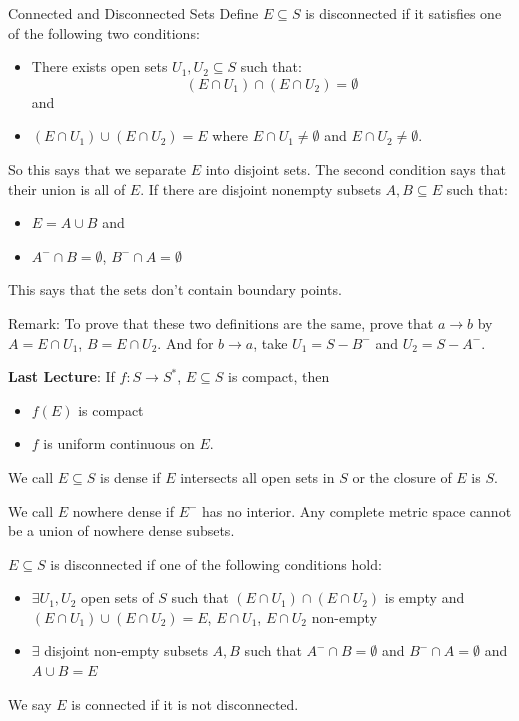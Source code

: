\documentclass{report}
\begin{document}
\begin{definition}{Connected and Disconnected Sets}
    Define $E \subseteq S$ is disconnected if it satisfies one of the following two conditions:
        \begin{itemize}
            \item There exists open sets $U_{1}, U_{2} \subseteq S$ such that:
                \begin{equation*}
                    (E \cap U_{1}) \cap (E \cap U_{2}) = \emptyset
                \end{equation*}
            and 

            \item  $(E \cap U_{1}) \cup (E \cap  U_{2}) = E$ where $E \cap U_{1} \neq \emptyset$ and $E \cap U_{2} \neq \emptyset$.
        \end{itemize}
    So this says that we separate $E$ into disjoint sets. The second condition says that their union is all of $E$. If there are disjoint nonempty subsets $A, B \subseteq E$ such that:
        \begin{itemize}
            \item $E = A \cup B$ and

            \item $A^{-} \cap B = \emptyset$, $B^{-} \cap A = \emptyset$
        \end{itemize}
    This says that the sets don't contain boundary points.
\end{definition}

Remark: To prove that these two definitions are the same, prove that $a \rightarrow b$ by $A = E \cap U_{1}$, $B = E \cap U_{2}$. And for $b \rightarrow a$, take $U_{1} = S - B^{-}$ and $U_{2} = S - A^{-}$.

\textbf{Last Lecture}: If $f: S \rightarrow S^{*}$, $E \subseteq S$ is compact, then 
    \begin{itemize}
        \item $f(E)$ is compact

        \item $f$ is uniform continuous on $E$. 
    \end{itemize}

We call $E \subseteq S$ is dense if $E$ intersects all open sets in $S$ or the closure of $E$ is $S$. 

We call $E$ nowhere dense if $E^{-}$ has no interior. Any complete metric space cannot be a union of nowhere dense subsets. 

$E \subseteq S$ is disconnected if one of the following conditions hold:
    \begin{itemize}
        \item $\exists U_{1}, U_{2}$ open sets of $S$ such that $(E \cap U_{1}) \cap(E \cap U_{2})$ is empty and $(E \cap U_{1}) \cup(E \cap U_{2}) = E$, $E \cap U_{1}$, $E \cap U_{2}$ non-empty

        \item $\exists $ disjoint non-empty subsets $A, B$ such that $A^{-} \cap B = \emptyset$ and $B^{-} \cap A = \emptyset$ and $A \cup B = E$
    \end{itemize}
We say $E$ is connected if it is not disconnected.
\end{document}
